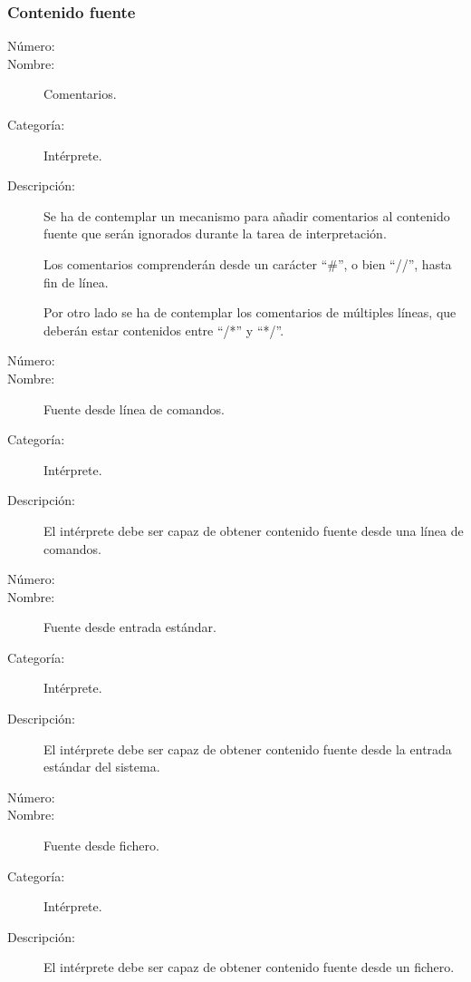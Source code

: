 \subsubsection{Contenido fuente}
	\begin{description}
		\item [Número:] \cn
		\item [Nombre:] Comentarios.
		\item [Categoría:] Intérprete.
		\item [Descripción:] Se ha de contemplar un mecanismo para añadir comentarios al contenido fuente que serán ignorados
		durante la tarea de interpretación. 
      
      Los comentarios comprenderán desde un carácter ``\#'', o bien ``//'', hasta fin de línea.
      
      Por otro lado se ha de contemplar los comentarios de múltiples líneas, que deberán estar contenidos entre ``/*'' y ``*/''.
	\end{description}


	\begin{description}
		\item [Número:] \cn
		\item [Nombre:] Fuente desde línea de comandos.
		\item [Categoría:] Intérprete.
		\item [Descripción:] El intérprete debe ser capaz de obtener contenido fuente desde una línea de comandos.
	\end {description}

	\begin{description}
		\item [Número:] \cn
		\item [Nombre:] Fuente desde entrada estándar.
		\item [Categoría:] Intérprete.
		\item [Descripción:] El intérprete debe ser capaz de obtener contenido fuente desde la entrada estándar del sistema.
	\end {description}

	\begin{description}
		\item [Número:] \cn
		\item [Nombre:] Fuente desde fichero.
		\item [Categoría:] Intérprete.
		\item [Descripción:] El intérprete debe ser capaz de obtener contenido fuente desde un fichero.
	\end {description}

